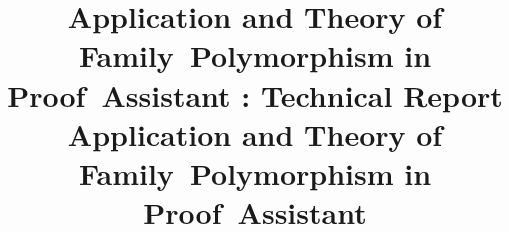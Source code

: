 \def\thetitle{%
Application and Theory of \mbox{Family Polymorphism} in \mbox{Proof Assistant}
}

\ifreport
\title{\thetitle: Technical Report}
\else
\title{\thetitle}
\fi


\newcommand{\TT}{\mbox{\textls[-20]{FMLTT}}\xspace}
\newcommand{\Lang}{\mbox{\scshape\textls[-10]{fpop}}\xspace}
